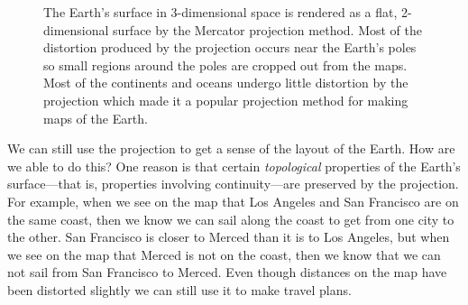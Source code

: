 \begin{figure}[h]
\centering
{}
\caption[Scott Hotton's modification of an image from the Cartographic Research Lab at the University of Alabama.]{The Earth's surface in 3-dimensional space is rendered as a flat, 2-dimensional surface by the Mercator projection method. Most of the distortion
produced by the projection occurs near the Earth's poles so small regions 
around the poles are cropped out from the maps. Most of the continents and
oceans undergo little distortion by the projection which made it a popular 
projection method for making maps of the Earth.} 
\label{Mercator}
\end{figure}




   We can still use the projection to get a sense of the layout of the Earth. 
How are we able to do this?  One reason is that certain {\em topological} 
properties of the Earth's surface---that is, properties involving 
continuity---are preserved by the projection. For example, when we see on the 
map that Los Angeles and San Francisco are on the same coast, then we know we 
can sail along the coast to get from one city to the other. San Francisco is
closer to Merced than it is to Los Angeles, but when we see on the map that 
Merced is not on the coast, then we know that we can not sail from San Francisco 
to Merced. Even though distances on the map have been distorted slightly we 
can still use it to make travel plans. 

